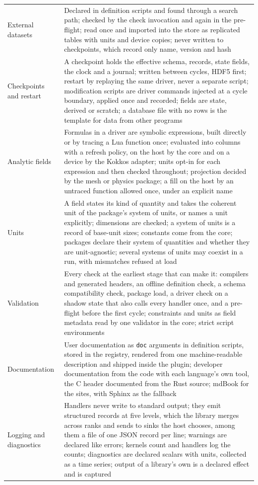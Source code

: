 \documentclass[11pt,a4paper]{article}
\newcommand{\code}[1]{\texttt{#1}}
\begin{document}
{\begin{xltabular}{\textwidth}{@{}>{\raggedright\arraybackslash}p{32mm} L@{}}
External datasets & Declared in definition scripts and found through a search path; checked by the check invocation and again in the pre-flight; read once and imported into the store as replicated tables with units and device copies; never written to checkpoints, which record only name, version and hash \\
Checkpoints and restart & A checkpoint holds the effective schema, records, state fields, the clock and a journal; written between cycles, HDF5 first; restart by replaying the same driver, never a separate script; modification scripts are driver commands injected at a cycle boundary, applied once and recorded; fields are state, derived or scratch; a database file with no rows is the template for data from other programs \\
Analytic fields & Formulas in a driver are symbolic expressions, built directly or by tracing a Lua function once; evaluated into columns with a refresh policy, on the host by the core and on a device by the Kokkos adapter; units opt-in for each expression and then checked throughout; projection decided by the mesh or physics package; a fill on the host by an untraced function allowed once, under an explicit name \\
Units & A field states its kind of quantity and takes the coherent unit of the package's system of units, or names a unit explicitly; dimensions are checked; a system of units is a record of base-unit sizes; constants come from the core; packages declare their system of quantities and whether they are unit-agnostic; several systems of units may coexist in a run, with mismatches refused at load \\
Validation & Every check at the earliest stage that can make it: compilers and generated headers, an offline definition check, a schema compatibility check, package load, a driver check on a shadow state that also calls every handler once, and a pre-flight before the first cycle; constraints and units as field metadata read by one validator in the core; strict script environments \\
Documentation & User documentation as \code{doc} arguments in definition scripts, stored in the registry, rendered from one machine-readable description and shipped inside the plugin; developer documentation from the code with each language's own tool, the C header documented from the Rust source; mdBook for the sites, with Sphinx as the fallback \\
Logging and diagnostics & Handlers never write to standard output; they emit structured records at five levels, which the library merges across ranks and sends to sinks the host chooses, among them a file of one JSON record per line; warnings are declared like errors; kernels count and handlers log the counts; diagnostics are declared scalars with units, collected as a time series; output of a library's own is a declared effect and is captured \\

\end{xltabular}}
\end{document}
